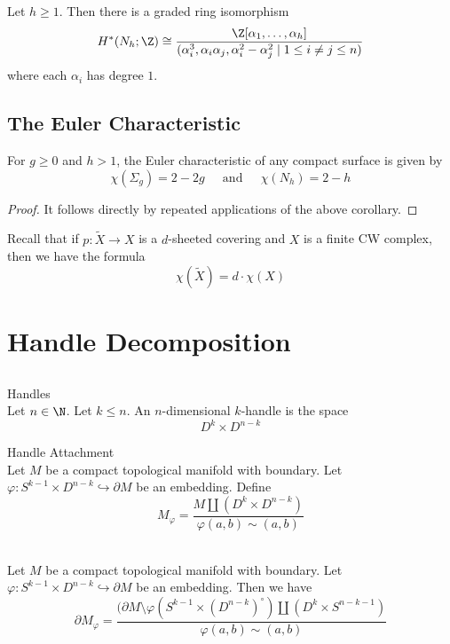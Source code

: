 \documentclass[a4paper]{article}
\begin{document}
\begin{prp}{}{} Let $h\geq 1$. Then there is a graded ring isomorphism $$H^\ast(N_h;\Z)\cong\frac{\Z[\alpha_1,\dots,\alpha_h]}{(\alpha_i^3,\alpha_i\alpha_j,\alpha_i^2-\alpha_j^2\;|\;1\leq i\neq j\leq n)}$$ where each $\alpha_i$ has degree $1$. 
\end{prp}

\subsection{The Euler Characteristic}
\begin{crl}{}{} For $g\geq 0$ and $h>1$, the Euler characteristic of any compact surface is given by $$\chi(\Sigma_g)=2-2g\;\;\;\;\text{ and }\;\;\;\;\chi(N_h)=2-h$$ 
\begin{proof}
It follows directly by repeated applications of the above corollary. 
\end{proof}
\end{crl}

Recall that if $p:\widetilde{X}\to X$ is a $d$-sheeted covering and $X$ is a finite CW complex, then we have the formula $$\chi(\widetilde{X})=d\cdot\chi(X)$$

\pagebreak
\section{Handle Decomposition}
\subsection{}
\begin{defn}{Handles}{}\\
Let $n\in\N$. Let $k\leq n$. An $n$-dimensional $k$-handle is the space $$D^k\times D^{n-k}$$
\end{defn}

\begin{defn}{Handle Attachment}{}\\
Let $M$ be a compact topological manifold with boundary. Let $\varphi:S^{k-1}\times D^{n-k}\hookrightarrow\partial M$ be an embedding. Define $$M_\varphi=\frac{M\coprod(D^k\times D^{n-k})}{\varphi(a,b)\sim(a,b)}$$
\end{defn}

\begin{prp}{}{}\\
Let $M$ be a compact topological manifold with boundary. Let $\varphi:S^{k-1}\times D^{n-k}\hookrightarrow\partial M$ be an embedding. Then we have $$\partial M_\varphi=\frac{(\partial M\setminus\varphi(S^{k-1}\times(D^{n-k})^\circ)\coprod(D^k\times S^{n-k-1})}{\varphi(a,b)\sim(a,b)}$$
\end{prp}
\end{document}
